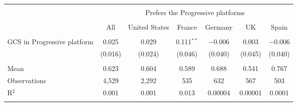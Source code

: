 
\begin{tabular}{@{\extracolsep{5pt}}lcccccc} 
\\[-1.8ex]\hline 
\hline \\[-1.8ex] 
 & \multicolumn{6}{c}{Prefers the Progressive platforms} \\ 
\cline{2-7} 
\\[-1.8ex] & All & United States & France & Germany & UK & Spain \\ 
\hline \\[-1.8ex] 
 GCS in Progressive platform & 0.025 & 0.029 & 0.111$^{**}$ & $-$0.006 & 0.003 & $-$0.006 \\ 
  & (0.016) & (0.024) & (0.046) & (0.040) & (0.045) & (0.040) \\ 
 \hline \\[-1.8ex] 
Mean & 0.623 & 0.604 & 0.589 & 0.688 & 0.541 & 0.767 \\ 
Observations & 4,529 & 2,292 & 535 & 632 & 567 & 503 \\ 
R$^{2}$ & 0.001 & 0.001 & 0.013 & 0.00004 & 0.00001 & 0.0001 \\ 
\hline 
\hline \\[-1.8ex] 
\end{tabular} 
